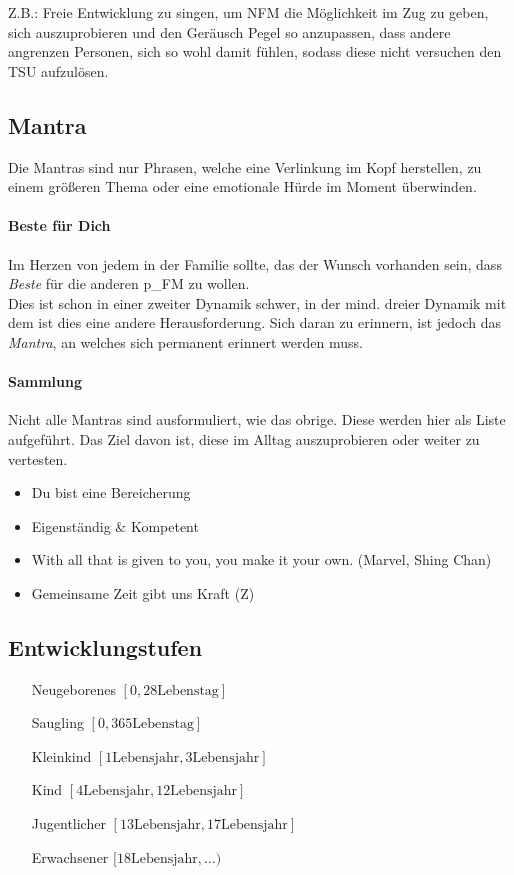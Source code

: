 Z.B.: Freie Entwicklung zu singen, um NFM die Möglichkeit im Zug zu geben, sich auszuprobieren und den Geräusch Pegel so anzupassen, dass andere angrenzen Personen, sich so wohl damit fühlen, sodass diese nicht versuchen den TSU aufzulösen.

\subsection{Mantra}
Die Mantras sind nur Phrasen, welche eine Verlinkung im Kopf herstellen, zu einem größeren Thema oder eine emotionale Hürde im Moment überwinden.


\paragraph{Beste für Dich}
Im Herzen von jedem in der Familie sollte, das der Wunsch vorhanden sein, dass \textit{Beste} für die anderen \gls{p_FM} zu wollen.\\

Dies ist schon in einer zweiter Dynamik schwer, in der mind. dreier Dynamik mit dem \NFMOOne ist dies eine andere Herausforderung. Sich daran zu erinnern, ist jedoch das \textit{Mantra}, an welches sich permanent erinnert werden muss.


\paragraph{Sammlung} 
Nicht alle Mantras sind ausformuliert, wie das obrige. Diese werden hier als Liste aufgeführt. Das Ziel davon ist, diese im Alltag auszuprobieren oder weiter zu vertesten. 

\begin{itemize}
	\item Du bist eine Bereicherung
	\item Eigenständig $\&$ Kompetent
	\item With all that is given to you, you make it your own. (Marvel, Shing Chan)
	\item Gemeinsame Zeit gibt uns Kraft (Z)
\end{itemize}

\subsection{Entwicklungstufen}

\begin{itemize}
	\item[Neugeborenes] $[0, 28 \text{Lebenstag}]$
	\item[Saugling] $[0,365 \text{Lebenstag}]$
	\item[Kleinkind] $[1 \text{Lebensjahr}, 3 \text{Lebensjahr}]$
	\item[Kind] $[4 \text{Lebensjahr}, 12 \text{Lebensjahr}]$
	\item[Jugentlicher] $[13 \text{Lebensjahr}, 17 \text{Lebensjahr}]$
	\item[Erwachsener] $[18 \text{Lebensjahr}, \dots )$
\end{itemize}


